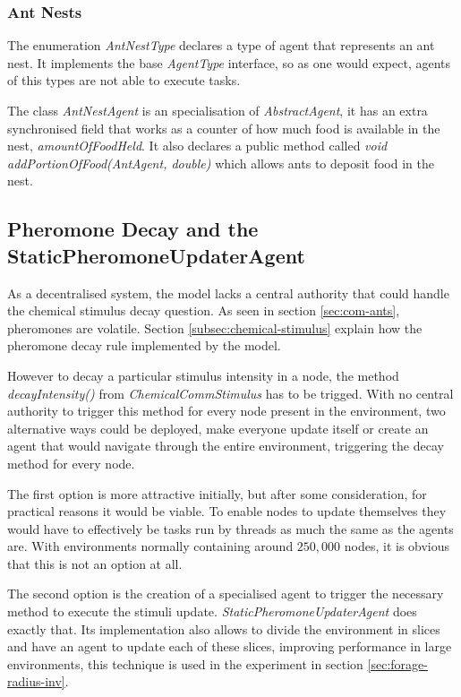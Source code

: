 \subsubsection{Ant Nests}
\label{sec:ant-nest}

The enumeration \emph{AntNestType} declares a type of agent that represents an ant nest. It implements the base \emph{AgentType} interface, so as one would expect, agents of this types are not able to execute tasks.

The class \emph{AntNestAgent} is an specialisation of \emph{AbstractAgent}, it has an extra synchronised field that works as a counter of how much food is available in the nest, \emph{amountOfFoodHeld}. It also declares a public method called \emph{void addPortionOfFood(AntAgent, double)} which allows ants to deposit food in the nest.

\subsection{Pheromone Decay and the StaticPheromoneUpdaterAgent}
\label{sec:pheromone-decay}

As a decentralised system, the model lacks a central authority that could handle the chemical stimulus decay question. As seen in section \ref{sec:com-ants}, pheromones are volatile. Section \ref{subsec:chemical-stimulus} explain how the pheromone decay rule implemented by the model. 

However to decay a particular stimulus intensity in a node, the method \emph{decayIntensity()} from \emph{ChemicalCommStimulus} has to be trigged. With no central authority to trigger this method for every node present in the environment, two alternative ways could be deployed, make everyone update itself or create an agent that would navigate through the entire environment, triggering the decay method for every node.

The first option is more attractive initially, but after some consideration, for practical reasons it would be viable. To enable nodes to update themselves they would have to effectively be tasks run by threads as much the same as the agents are. With environments normally containing around $250,000$ nodes, it is obvious that this is not an option at all.

The second option is the creation of a specialised agent to trigger the necessary method to execute the stimuli update. \emph{StaticPheromoneUpdaterAgent} does exactly that. Its implementation also allows to divide the environment in slices and have an agent to update each of these slices, improving performance in large environments, this technique is used in the experiment in section \ref{sec:forage-radius-inv}.

